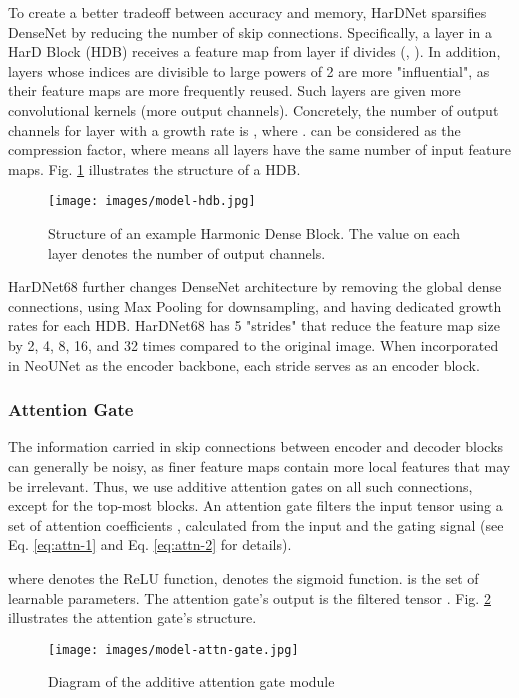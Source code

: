 \documentclass[runningheads]{llncs}
\newcommand{\ModelName}{NeoUNet\xspace}
\begin{document}
	To create a better tradeoff between accuracy and memory, HarDNet sparsifies DenseNet by reducing the number of skip connections. Specifically, a layer  in a HarD Block (HDB) receives a feature map from layer  if  divides  (, ). In addition, layers whose indices are divisible to large powers of 2 are more "influential", as their feature maps are more frequently reused. Such layers are given more convolutional kernels (more output channels). Concretely, the number of output channels for layer  with a growth rate  is , where .  can be considered as the compression factor, where  means all layers have the same number of input feature maps. Fig. \ref{fig:model-hdb} illustrates the structure of a HDB.

	\begin{figure}
		\centering
		\texttt{[image: images/model-hdb.jpg]}
		\caption{Structure of an example Harmonic Dense Block. The value on each layer denotes the number of output channels.}
		\label{fig:model-hdb}
	\end{figure}

	HarDNet68 further changes DenseNet architecture by removing the global dense connections, using Max Pooling for downsampling, and having dedicated growth rates for each HDB. HarDNet68 has 5 "strides" that reduce the feature map size by 2, 4, 8, 16, and 32 times compared to the original image. When incorporated in \ModelName as the encoder backbone, each stride serves as an encoder block.

	\subsubsection{Attention Gate}
	The information carried in skip connections between encoder and decoder blocks can generally be noisy, as finer feature maps contain more local features that may be irrelevant. Thus, we use additive attention gates \cite{oktay2018attention} on all such connections, except for the top-most blocks. An attention gate filters the input tensor using a set of attention coefficients , calculated from the input  and the gating signal  (see Eq. \eqref{eq:attn-1} and Eq. \eqref{eq:attn-2} \cite{oktay2018attention} for details).

	
	where  denotes the ReLU function,  denotes the sigmoid function.  is the set of learnable parameters. The attention gate's output is the filtered tensor . Fig. \ref{fig:attn} illustrates the attention gate's structure.

	\begin{figure}
		\centering
		\texttt{[image: images/model-attn-gate.jpg]}
		\caption{Diagram of the additive attention gate module \cite{oktay2018attention}}
		\label{fig:attn}
	\end{figure}
\end{document}
